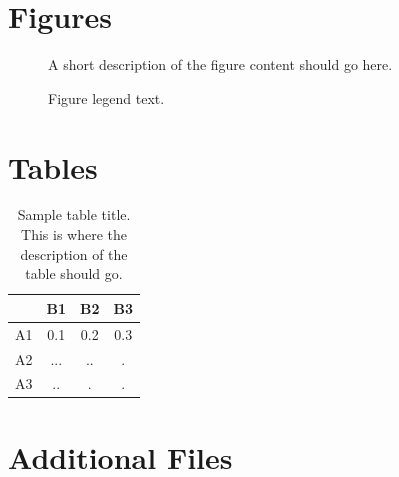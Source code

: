 \documentclass{bmcart}
\begin{document}
\begin{backmatter}


\section*{Figures}
  \begin{figure}[h!]
  \caption{
      A short description of the figure content
      should go here.}
      \end{figure}

\begin{figure}[h!]
  \caption{
      Figure legend text.}
      \end{figure}


\section*{Tables}
\begin{table}[h!]
\caption{Sample table title. This is where the description of the table should go.}
      \begin{tabular}{cccc}
        \hline
           & B1  &B2   & B3\\ \hline
        A1 & 0.1 & 0.2 & 0.3\\
        A2 & ... & ..  & .\\
        A3 & ..  & .   & .\\ \hline
      \end{tabular}
\end{table}


\section*{Additional Files}

\end{backmatter}
\end{document}
